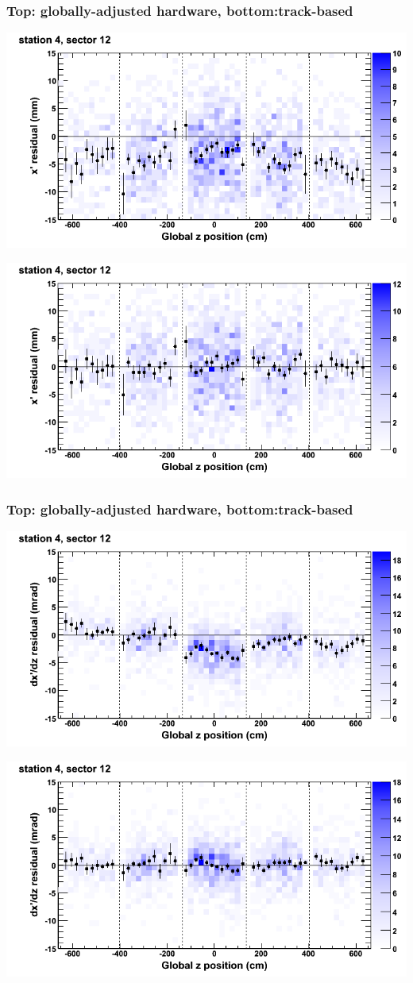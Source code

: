 \documentclass[compress]{beamer}
\begin{document}
\begin{frame}
\frametitle{Top: globally-adjusted hardware, bottom:track-based}
\includegraphics[width=0.7\linewidth]{NOV4_mapplots_HW/DTvsz_st4sec12_x.png}

\includegraphics[width=0.7\linewidth]{NOV4_mapplots/DTvsz_st4sec12_x.png}
\end{frame}

\begin{frame}
\frametitle{Top: globally-adjusted hardware, bottom:track-based}
\includegraphics[width=0.7\linewidth]{NOV4_mapplots_HW/DTvsz_st4sec12_dxdz.png}

\includegraphics[width=0.7\linewidth]{NOV4_mapplots/DTvsz_st4sec12_dxdz.png}
\end{frame}
\end{document}
